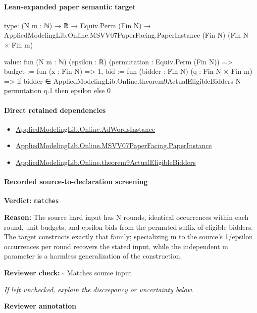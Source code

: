 \documentclass[10pt]{article}
\newcommand{\reviewerbox}{%
  \par\noindent\fbox{\parbox{0.96\linewidth}{\rule{0pt}{0.38in}}}\par
}
\newcommand{\reviewmatch}[1]{%
  \par\noindent\textbf{Reviewer check:} $\square$\; #1\par
  \noindent\emph{If left unchecked, explain the discrepancy or uncertainty below.}\par
}
\begin{document}
\paragraph{Lean-expanded paper semantic target}
\begin{ReviewVerbatim}
type:
(N m : ℕ) → ℝ → Equiv.Perm (Fin N) → AppliedModelingLib.Online.MSVV07PaperFacing.PaperInstance (Fin N) (Fin N × Fin m)

value:
fun (N m : ℕ) (epsilon : ℝ) (permutation : Equiv.Perm (Fin N)) =>
  { budget := fun (x : Fin N) => 1,
    bid := fun (bidder : Fin N) (q : Fin N × Fin m) =>
      if bidder ∈ AppliedModelingLib.Online.theorem9ActualEligibleBidders N permutation q.1 then epsilon else 0 }
\end{ReviewVerbatim}

\paragraph{Direct retained dependencies}
\begin{itemize}\raggedright
\item \hyperlink{governing-declaration-e5ce49672bf26ab1}{Applied\allowbreak{}Modeling\allowbreak{}Lib.\allowbreak{}Online.\allowbreak{}Ad\allowbreak{}Words\allowbreak{}Instance}
\item \hyperlink{governing-declaration-11907576ec71eeb5}{Applied\allowbreak{}Modeling\allowbreak{}Lib.\allowbreak{}Online.\allowbreak{}MSVV07\allowbreak{}Paper\allowbreak{}Facing.\allowbreak{}Paper\allowbreak{}Instance}
\item \hyperlink{governing-declaration-a6d5ecf54184d40a}{Applied\allowbreak{}Modeling\allowbreak{}Lib.\allowbreak{}Online.\allowbreak{}theorem9\allowbreak{}Actual\allowbreak{}Eligible\allowbreak{}Bidders}
\end{itemize}
\paragraph{Recorded source-to-declaration screening}
\textbf{Verdict:} \texttt{matches}
\\
{\raggedright
\textbf{Reason:} The source hard input has N rounds, identical occurrences within each round, unit budgets, and epsilon bids from the permuted suffix of eligible bidders.\allowbreak{} The target constructs exactly that family;\allowbreak{} specializing m to the source's 1/\allowbreak{}epsilon occurrences per round recovers the stated input, while the independent m parameter is a harmless generalization of the construction.\allowbreak{}
\par}
\reviewmatch{Matches source input}
\noindent\textbf{Reviewer annotation}\par
\reviewerbox
\clearpage
\hypertarget{paper-prerequisite-90b324d8fe8d736c}{}
\end{document}
